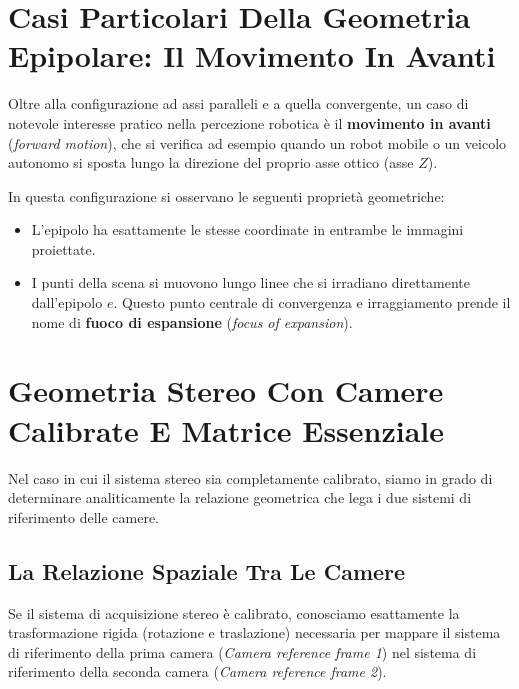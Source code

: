 ﻿\documentclass[11pt, a4paper]{article}
\begin{document}
\section{Casi Particolari Della Geometria Epipolare: Il Movimento In Avanti}

Oltre alla configurazione ad assi paralleli e a quella convergente, un caso di notevole interesse pratico nella percezione robotica è il \textbf{movimento in avanti} (\emph{forward motion}), che si verifica ad esempio quando un robot mobile o un veicolo autonomo si sposta lungo la direzione del proprio asse ottico (asse $Z$).


In questa configurazione si osservano le seguenti proprietà geometriche:
\begin{itemize}[noitemsep]
    \item L'epipolo ha esattamente le stesse coordinate in entrambe le immagini proiettate.
    \item I punti della scena si muovono lungo linee che si irradiano direttamente dall'epipolo $e$. Questo punto centrale di convergenza e irraggiamento prende il nome di \textbf{fuoco di espansione} (\emph{focus of expansion}).
\end{itemize}

\newpage

\section{Geometria Stereo Con Camere Calibrate E Matrice Essenziale}

Nel caso in cui il sistema stereo sia completamente calibrato, siamo in grado di determinare analiticamente la relazione geometrica che lega i due sistemi di riferimento delle camere.




\subsection{La Relazione Spaziale Tra Le Camere}

Se il sistema di acquisizione stereo è calibrato, conosciamo esattamente la trasformazione rigida (rotazione e traslazione) necessaria per mappare il sistema di riferimento della prima camera (\emph{Camera reference frame 1}) nel sistema di riferimento della seconda camera (\emph{Camera reference frame 2}).
\end{document}
